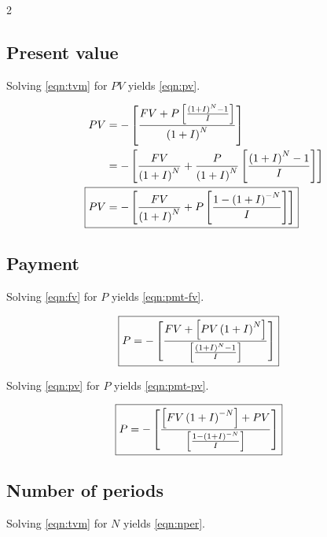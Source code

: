 \documentclass[11pt]{article}%
\begin{document}
\begin{multicols*}{2}
\subsection{Present value}\label{sec:pv}

Solving \eqref{eqn:tvm} for $PV$ yields \eqref{eqn:pv}.

\begin{align}
PV &= -\left[ \frac{FV + P \left[\frac{\left( 1 + I \right)^{N} - 1}{I} \right]}{\left( 1 + I \right)^{N}} \right] \\
 &= -\left[ \frac{FV}{\left( 1 + I \right)^{N}} + \frac{P}{\left( 1 + I \right)^{N}} \left[\frac{\left( 1 + I \right)^{N} - 1}{I} \right] \right] \\
\Aboxed{PV &= -\left[ \frac{FV}{\left( 1 + I \right)^{N}} + P \left[\frac{1 - \left( 1 + I \right)^{-N}}{I} \right] \right]} \label{eqn:pv}
\end{align}

\subsection{Payment}\label{sec:pmt}

Solving \eqref{eqn:fv} for $P$ yields \eqref{eqn:pmt-fv}.

\begin{align}
\Aboxed{P &= -\left[ \frac{FV + \left[ PV \left( 1 + I \right)^{N} \right]}{\left[\frac{\left( 1 + I \right)^{N} - 1}{I} \right]} \right]} \label{eqn:pmt-fv}
\end{align}

Solving \eqref{eqn:pv} for $P$ yields \eqref{eqn:pmt-pv}.

\begin{align}
\Aboxed{P &= -\left[ \frac{\left[ FV \left( 1 + I \right)^{-N} \right] + PV}{\left[\frac{1 - \left( 1 + I \right)^{-N}}{I} \right]} \right]} \label{eqn:pmt-pv}
\end{align}

\subsection{Number of periods}\label{sec:nper}

Solving \eqref{eqn:tvm} for $N$ yields \eqref{eqn:nper}.


\end{multicols*}
\end{document}
